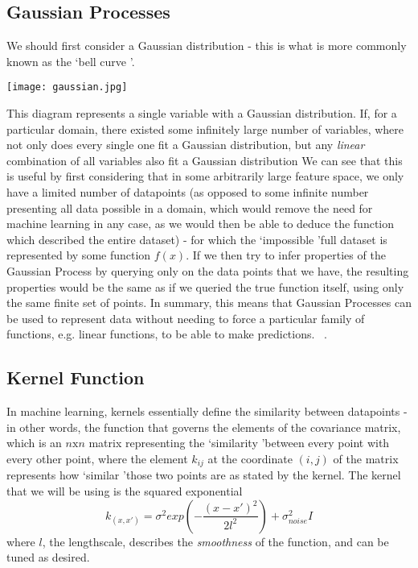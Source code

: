\documentclass[10pt,sts]{article}
\begin{document}
\begin{multicols}{2}
    \subsection{Gaussian Processes}

    We should first consider a Gaussian distribution - this is what is more commonly known as the \lq bell curve \rq. 

    \texttt{[image: gaussian.jpg]}

    This diagram represents a single variable with a Gaussian distribution. If, for a particular domain, there existed some infinitely large number of variables, where not only does every single one fit a Gaussian distribution, but any \textit{linear} combination of all variables also fit a Gaussian distribution We can see that this is useful by first considering that in some arbitrarily large feature space, we only have a limited number of datapoints (as opposed to some infinite number presenting all data possible in a domain, which would remove the need for machine learning in any case, as we would then be able to deduce the function which described the entire dataset) - for which the \lq impossible \rq full dataset is represented by some function $f(x)$. If we then try to infer properties of the Gaussian Process by querying only on the data points that we have, the resulting properties would be the same as if we queried the true function itself, using only the same finite set of points. In summary, this means that Gaussian Processes can be used to represent data without needing to force a particular family of functions, e.g. linear functions, to be able to make predictions. ~\citep{rasmussen06}.

    \subsection{Kernel Function} In machine learning, kernels essentially define the similarity between datapoints - in other words, the function that governs the elements of the covariance matrix, which is an $n \textrm{x} n$ matrix representing the \lq similarity \rq between every point with every other point, where the element $k_{ij}$ at the coordinate $(i,j)$ of the matrix represents how \lq similar \rq those two points are as stated by the kernel. The kernel that we will be using is the squared exponential $$ k_{(x, x')} = \sigma^2 exp\left(-\frac{(x-x')^2}{2l^2}\right) + \sigma^2_{noise}I$$ where $l$, the lengthscale, describes the \textit{smoothness} of the function, and can be tuned as desired.


\end{multicols}
\end{document}

